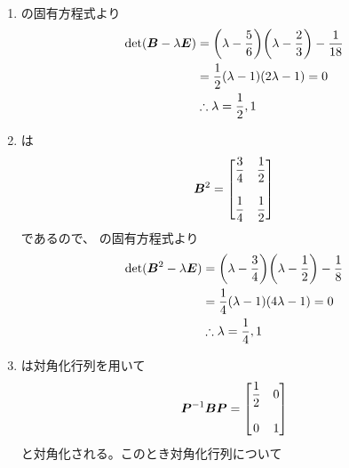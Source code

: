\begin{ans*}
  ${}$
  \begin{enumerate}[label=(\arabic*)]
    \item \bB の固有方程式より
    \begin{align}
      \det(\bm{B}-{\lambda}\bm{E})
      &=
      \biggl({\lambda}-\frac{5}{6}\biggr)\biggl({\lambda}-\frac{2}{3}\biggr)-\frac{1}{18} \\
      &= \frac{1}{2}({\lambda} - 1)(2{\lambda} - 1) = 0 \\
      &\therefore {\lambda} = \frac{1}{2}, 1
    \end{align}
    \item
    は
    \begin{gather}
      \bm{B}^2 =
      \begin{bmatrix}
        {\displaystyle\frac{3}{4}} & {\displaystyle \frac{1}{2}} \\
        \\
        {\displaystyle \frac{1}{4}} & {\displaystyle \frac{1}{2}} \\
      \end{bmatrix}
    \end{gather}
    であるので、 の固有方程式より
    \begin{align}
      \det(\bm{B}^2-{\lambda}\bm{E})
      &=
      \biggl({\lambda}-\frac{3}{4}\biggr)\biggl({\lambda}-\frac{1}{2}\biggr)-\frac{1}{8} \\
      &= \frac{1}{4}({\lambda} - 1)(4{\lambda} - 1) = 0 \\
      &\therefore {\lambda} = \frac{1}{4}, 1
    \end{align}

    \item
    \bB は対角化行列\bP を用いて
    \begin{gather}
      \bm{P}^{-1}\bm{B}\bm{P} =
      \begin{bmatrix}
        {\displaystyle\frac{1}{2}} & 0 \\
        \\
        0 & {1} \\
      \end{bmatrix}
    \end{gather}
    と対角化される。このとき対角化行列\bP について


\end{enumerate}
\end{ans*}
